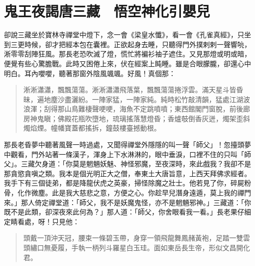 
\chapter{鬼王夜謁唐三藏　悟空神化引嬰兒}

卻說三藏坐於寶林寺禪堂中燈下，念一會《梁皇水懺》，看一會《孔雀真經》，只坐到三更時候，卻才把經本包在囊裡。正欲起身去睡，只聽得門外撲剌剌一聲響喨，淅零零刮陣狂風。那長老恐吹滅了燈，慌忙將褊衫袖子遮住。又見那燈或明或暗，便覺有些心驚膽戰。此時又困倦上來，伏在經案上盹睡。雖是合眼朦朧，卻還心中明白。耳內嚶嚶，聽著那窗外陰風颯颯。好風！真個那：
\begin{quote}
淅淅瀟瀟，飄飄蕩蕩。淅淅瀟瀟飛落葉，飄飄蕩蕩捲浮雲。滿天星斗皆昏昧，遍地塵沙盡灑紛。一陣家猛，一陣家純。純時松竹敲清韻，猛處江湖波浪渾；刮得那山鳥難棲聲哽哽，海魚不定跳噴噴；東西館閣門窗脫，前後廊房神鬼瞋；佛殿花瓶吹墮地，琉璃搖落慧燈昏；香爐攲倒香灰迸，燭架歪斜燭焰煙。幢幡寶蓋都搖拆，鐘鼓樓臺撼動根。
\end{quote}

那長老昏夢中聽著風聲一時過處，又聞得禪堂外隱隱的叫一聲「師父」！忽擡頭夢中觀看，門外站著一條漢子，渾身上下水淋淋的，眼中垂淚，口裡不住的只叫「師父」。三藏欠身道：「你莫是魍魎妖魅、神怪邪魔，至夜深時，來此戲我？我卻不是那貪慾貪嗔之類。我本是個光明正大之僧，奉東土大唐旨意，上西天拜佛求經者。我手下有三個徒弟，都是降龍伏虎之英豪，掃怪除魔之壯士。他若見了你，碎屍粉骨，化作微塵。此是我大慈悲之意，方便之心。你趁早兒潛身遠遁，莫上我的禪門來。」那人倚定禪堂道：「師父，我不是妖魔鬼怪，亦不是魍魎邪神。」三藏道：「你既不是此類，卻深夜來此何為？」那人道：「師父，你舍眼看我一看。」長老果仔細定睛看處，呀！只見他：
\begin{quote}
頭戴一頂沖天冠，腰束一條碧玉帶，身穿一領飛龍舞鳳赭黃袍，足踏一雙雲頭繡口無憂履，手執一柄列斗羅星白玉珪。面如東岳長生帝，形似文昌開化君。
\end{quote}

